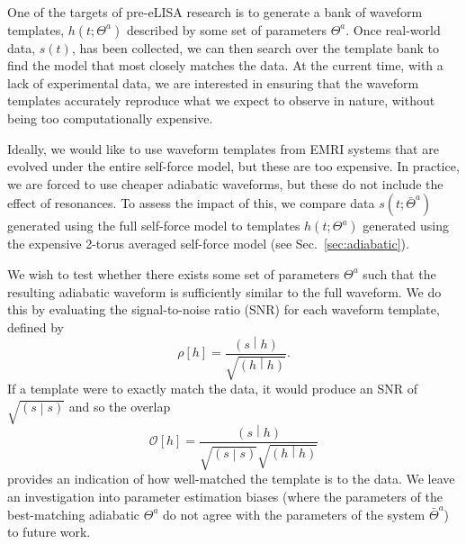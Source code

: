 \documentclass[aps,prd,amsfonts,amssymb,amsmath,nofootinbib,showpacs,superscriptaddress,twocolumn]{revtex4}
\newcommand{\secref}[1]{Sec.\ \ref{sec:#1}}
\newcommand{\overlap}[2]{\ensuremath{\left(#1\middle|#2\right)}}
\begin{document}
One of the targets of pre-eLISA research is to generate a bank of waveform templates, $h(t;\Theta^a)$ described by some set of parameters $\Theta^a$. Once real-world data, $s(t)$, has been collected, we can then search over the template bank to find the model that most closely matches the data. At the current time, with a lack of experimental data, we are interested in ensuring that the waveform templates accurately reproduce what we expect to observe in nature, without being too computationally expensive.

Ideally, we would like to use waveform templates from EMRI systems that are evolved under the entire self-force model, but these are too expensive. In practice, we are forced to use cheaper adiabatic waveforms, but these do not include the effect of resonances. To assess the impact of this, we compare data $s(t;\bar{\Theta}^a)$ generated using the full self-force model to templates $h(t;\Theta^a)$ generated using the expensive 2-torus averaged self-force model (see \secref{adiabatic}).

We wish to test whether there exists some set of parameters $\Theta^a$ such that the resulting adiabatic waveform is sufficiently similar to the full waveform. We do this by evaluating the signal-to-noise ratio (SNR) for each waveform template, defined by
\begin{equation}
\rho\left[h\right] = \frac{\overlap{s}{h}}{\sqrt{\overlap{h}{h}}}.
\end{equation}
If a template were to exactly match the data, it would produce an SNR of $\sqrt{\overlap{s}{s}}$ and so the overlap
\begin{equation}
\label{eq:overlap}
\mathcal{O}\left[h\right] = \frac{\overlap{s}{h}}{\sqrt{\overlap{s}{s}}\sqrt{\overlap{h}{h}}}
\end{equation}
provides an indication of how well-matched the template is to the data. We leave an investigation into parameter estimation biases (where the parameters of the best-matching adiabatic $\Theta^a$ do not agree with the parameters of the system $\bar{\Theta}^a$) to future work.
\end{document}
